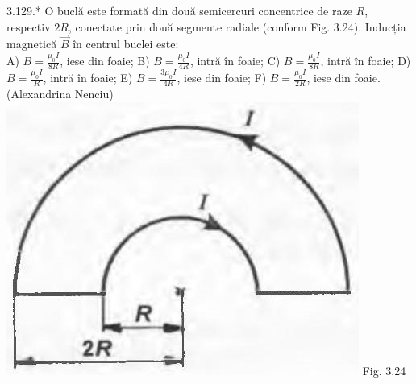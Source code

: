 \documentclass[10pt]{article}
\begin{document}
3.129.* O buclă este formată din două semicercuri concentrice de raze $R$, respectiv $2 R$, conectate prin două segmente radiale (conform Fig. 3.24). Inducția magnetică $\vec{B}$ în centrul buclei este:\\ A) $B=\frac{\mu_{0} I}{8 R}$, iese din foaie; B) $B=\frac{\mu_{0} I}{4 R}$, intră în foaie; C) $B=\frac{\mu_{0} I}{8 R}$, intră în foaie; D) $B=\frac{\mu_{0} I}{R}$, intră în foaie; E) $B=\frac{3 \mu_{0} I}{4 R}$, iese din foaie; F) $B=\frac{\mu_{0} I}{2 R}$, iese din foaie.\\ (Alexandrina Nenciu)\\ \includegraphics[max width=\textwidth, center]{2025_07_01_5b3ff9fa0d508c8e9f17g-171(2)} Fig. 3.24\\
\end{document}
